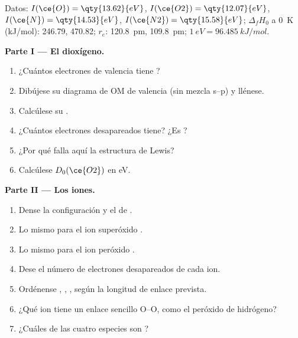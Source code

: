 \begin{problem}
\label{pb:b2:diatomic-mos:1}
Datos: $I(\ce{O}) = \qty{13.62}{eV}$, $I(\ce{O2}) = \qty{12.07}{eV}$, $I(\ce{N}) =
\qty{14.53}{eV}$, $I(\ce{N2}) = \qty{15.58}{eV}$; $\Delta_f H_0$ a \qty{0}{K}
(\unit{kJ/mol}):  246.79,  470.82; $r_e$:  \qty{120.8}{pm}, 
\qty{109.8}{pm}; $1\ \unit{eV} = \qty{96.485}{kJ/mol}$.

\medskip
\noindent\textbf{Parte I --- El dioxígeno.}
\begin{enumerate}
  \item ¿Cuántos electrones de valencia tiene ?
  \item Dibújese su diagrama de OM de valencia (sin mezcla s--p) y llénese.
  \item Calcúlese su .
  \item ¿Cuántos electrones desapareados tiene? ¿Es  ?
  \item ¿Por qué falla aquí la estructura de Lewis?
  \item Calcúlese $D_0(\ce{O2})$ en \unit{eV}.
\end{enumerate}

\medskip
\noindent\textbf{Parte II --- Los iones.}
\begin{enumerate}[resume]
  \item Dense la configuración y el  de .
  \item Lo mismo para el ion superóxido .
  \item Lo mismo para el ion peróxido .
  \item Dese el número de electrones desapareados de cada ion.
  \item Ordénense , , ,  según la longitud de enlace prevista.
  \item ¿Qué ion tiene un enlace sencillo O--O, como el peróxido de hidrógeno?
  \item ¿Cuáles de las cuatro especies son ?
\end{enumerate}


\end{problem}
